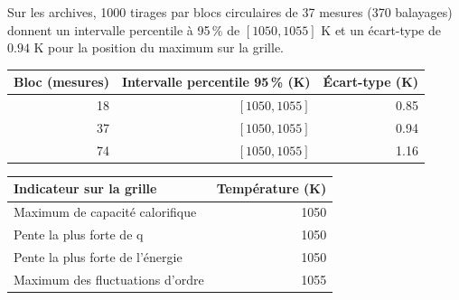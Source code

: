 Sur les archives, 1000 tirages par blocs circulaires de 37 mesures (370 balayages) donnent un intervalle percentile à 95\,\% de $[1050,1055]$ K et un écart-type de $0.94$ K pour la position du maximum sur la grille.
\begin{center}\small\begin{tabular}{rrr}\toprule
Bloc (mesures) & Intervalle percentile 95\,\% (K) & Écart-type (K)\\\midrule
18 & $[1050,1055]$ & 0.85\\
37 & $[1050,1055]$ & 0.94\\
74 & $[1050,1055]$ & 1.16\\
\bottomrule\end{tabular}\end{center}
\begin{center}\small\begin{tabular}{lr}\toprule
Indicateur sur la grille & Température (K)\\\midrule
Maximum de capacité calorifique & 1050\\
Pente la plus forte de q & 1050\\
Pente la plus forte de l'énergie & 1050\\
Maximum des fluctuations d'ordre & 1055\\
\bottomrule\end{tabular}\end{center}
